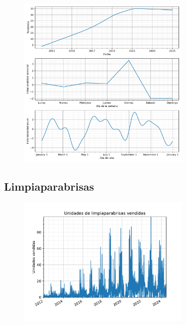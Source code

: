 \begin{figure}[H]
	{\includegraphics[width=0.75\textwidth]{imagenes/comps_aceites.pdf}}
\end{figure}

\subsection{Limpiaparabrisas}

\begin{figure}[H]
	{\includegraphics[width=0.75\textwidth]{imagenes/grafica_limpiaparabrisas.pdf}}
\end{figure}

